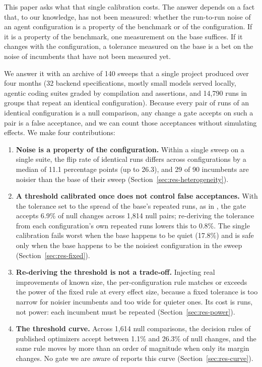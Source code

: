 This paper asks what that single calibration costs. The answer depends on a fact
that, to our knowledge, has not been measured: whether the run-to-run noise of
an agent configuration is a property of the benchmark or of the configuration.
If it is a property of the benchmark, one measurement on the base suffices. If
it changes with the configuration, a tolerance measured on the base is a bet on
the noise of incumbents that have not been measured yet.

We answer it with an archive of 140 sweeps that a single project produced over
four months (32 backend specifications, mostly small models served locally,
agentic coding suites graded by compilation and assertions, and 14{,}790 runs in
groups that repeat an identical configuration). Because every pair of runs of an identical configuration is a
null comparison, any change a gate accepts on such a pair is a false acceptance,
and we can count those acceptances without simulating effects. We make four
contributions:

\begin{enumerate}
  \item \textbf{Noise is a property of the configuration.} Within a single sweep
  on a single suite, the flip rate of identical runs differs across
  configurations by a median of 11.1 percentage points (up to 26.3), and 29 of
  90 incumbents are noisier than the base of their sweep
  (Section~\ref{sec:res-heterogeneity}).
  \item \textbf{A threshold calibrated once does not control false acceptances.}
  With the tolerance set to the spread of the base's repeated runs, as in
  \citet{xia2026rrsi}, the gate accepts 6.9\% of null changes across 1{,}814
  null pairs; re-deriving the tolerance from each configuration's own repeated
  runs lowers this to 0.8\%. The single calibration fails worst when the base
  happens to be quiet (17.8\%) and is safe only when the base happens to be the
  noisiest configuration in the sweep (Section~\ref{sec:res-fixed}).
  \item \textbf{Re-deriving the threshold is not a trade-off.} Injecting real
  improvements of known size, the per-configuration rule matches or exceeds the
  power of the fixed rule at every effect size, because a fixed tolerance is
  too narrow for noisier incumbents and too wide for quieter ones. Its cost is
  runs, not power: each incumbent must be repeated (Section~\ref{sec:res-power}).
  \item \textbf{The threshold curve.} Across 1{,}614 null comparisons, the
  decision rules of published optimizers accept between 1.1\% and 26.3\% of null
  changes, and the same rule moves by more than an order of magnitude when only
  its margin changes. No gate we are aware of reports this curve
  (Section~\ref{sec:res-curve}).
\end{enumerate}

